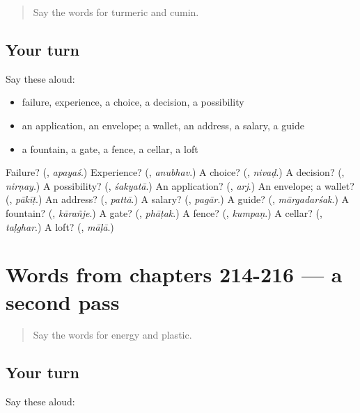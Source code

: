 \label{lesson:MR-R216-first-pass-words-from-chapters-211-213}



\begin{quote}
Say the words for turmeric and cumin.
\end{quote}

\subsection*{Your turn}
Say these aloud:

\begin{itemize}
\raggedright
  \item failure, experience, a choice, a decision, a possibility
  \item an application, an envelope; a wallet, an address, a salary, a guide
  \item a fountain, a gate, a fence, a cellar, a loft
\end{itemize}

\begin{tcolorbox}[breakable,colback=teal!4,colframe=teal!35!black,title={Before you move on}]
Failure? (\textbf{}, \emph{apayaś}.) Experience? (\textbf{}, \emph{anubhav}.) A choice? (\textbf{}, \emph{nivaḍ}.) A decision? (\textbf{}, \emph{nirṇay}.) A possibility? (\textbf{}, \emph{śakyatā}.) An application? (\textbf{}, \emph{arj}.) An envelope; a wallet? (\textbf{}, \emph{pākīṭ}.) An address? (\textbf{}, \emph{pattā}.) A salary? (\textbf{}, \emph{pagār}.) A guide? (\textbf{}, \emph{mārgadarśak}.) A fountain? (\textbf{}, \emph{kārañje}.) A gate? (\textbf{}, \emph{phāṭak}.) A fence? (\textbf{}, \emph{kumpaṇ}.) A cellar? (\textbf{}, \emph{taḷghar}.) A loft? (\textbf{}, \emph{māḷā}.)
\end{tcolorbox}
\section[(dialogue)]{Words from chapters 214-216 — a second pass}

\label{lesson:MR-R216-second-pass-words-from-chapters-214-216}



\begin{quote}
Say the words for energy and plastic.
\end{quote}

\subsection*{Your turn}
Say these aloud:

